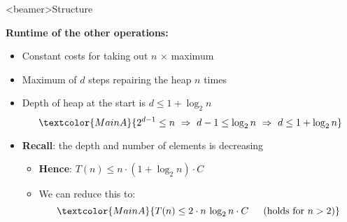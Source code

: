 \setcounter{subsubsection}{0}

\begin{frame}<beamer>{Structure}
\end{frame}

\begin{frame}
  \textbf{Runtime of the other operations:}
  \begin{itemize}
    \item<2- |handout:1>
      Constant costs for taking out {\color{MainA}$n$} $\times$ maximum
    \item<3- |handout:1>
      Maximum of {\color{MainA}$d$} steps repairing the heap
      {\color{MainA}$n$} times
    \item<4- |handout:1>
      Depth of heap at the start is {\color{MainA}$d \leq 1 + \log_2 n$}
      \begin{displaymath}
        \textcolor{MainA}{
          2^{d-1} \leq n
          ~\Rightarrow~
          d - 1 \leq \log_2 n
          ~\Rightarrow~
          d \leq 1 + \log_2 n
        }
      \end{displaymath}
    \item<5- |handout:1>
      \textbf{Recall}: the depth and number of elements is decreasing
      \begin{itemize}
        \item<6- |handout:1>
          \textbf{Hence}:
          {\color{MainA}$T(n) \leq n \cdot (1 +\log_2 n) \cdot C$}
        \item<7- |handout:1>
          We can reduce this to:
          \begin{displaymath}
            \textcolor{MainA}{
              T(n) \leq 2 \cdot n  \, \log_2 n \cdot C
              \hspace{1.5em} (\text{holds for}~n > 2)
            }
          \end{displaymath}
      \end{itemize}
  \end{itemize}
\end{frame}


